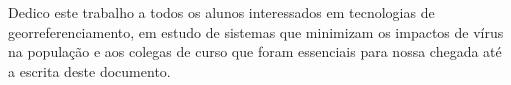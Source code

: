 Dedico este trabalho a todos os alunos interessados em tecnologias de georreferenciamento, em estudo de sistemas que minimizam os impactos de vírus na população e aos colegas de curso que foram essenciais para nossa chegada até a escrita deste documento.
